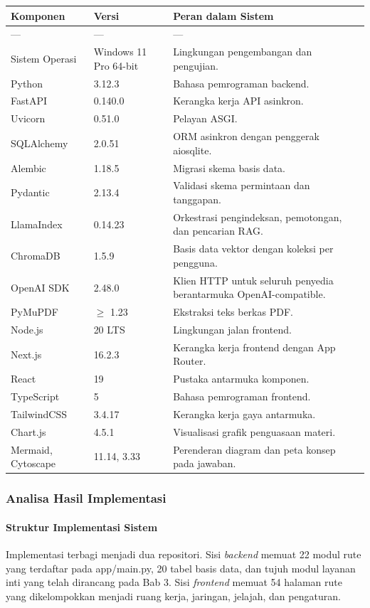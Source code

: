 \documentclass[12pt,a4paper]{article}
\begin{document}
\begin{table}[h]
\centering
\begin{tabular}{lll}
\toprule
Komponen & Versi & Peran dalam Sistem \\
\midrule
--- & --- & --- \\
Sistem Operasi & Windows 11 Pro 64-bit & Lingkungan pengembangan dan pengujian. \\
Python & 3.12.3 & Bahasa pemrograman backend. \\
FastAPI & 0.140.0 & Kerangka kerja API asinkron. \\
Uvicorn & 0.51.0 & Pelayan ASGI. \\
SQLAlchemy & 2.0.51 & ORM asinkron dengan penggerak aiosqlite. \\
Alembic & 1.18.5 & Migrasi skema basis data. \\
Pydantic & 2.13.4 & Validasi skema permintaan dan tanggapan. \\
LlamaIndex & 0.14.23 & Orkestrasi pengindeksan, pemotongan, dan pencarian RAG. \\
ChromaDB & 1.5.9 & Basis data vektor dengan koleksi per pengguna. \\
OpenAI SDK & 2.48.0 & Klien HTTP untuk seluruh penyedia berantarmuka OpenAI-compatible. \\
PyMuPDF & $\ge$ 1.23 & Ekstraksi teks berkas PDF. \\
Node.js & 20 LTS & Lingkungan jalan frontend. \\
Next.js & 16.2.3 & Kerangka kerja frontend dengan App Router. \\
React & 19 & Pustaka antarmuka komponen. \\
TypeScript & 5 & Bahasa pemrograman frontend. \\
TailwindCSS & 3.4.17 & Kerangka kerja gaya antarmuka. \\
Chart.js & 4.5.1 & Visualisasi grafik penguasaan materi. \\
Mermaid, Cytoscape & 11.14, 3.33 & Perenderan diagram dan peta konsep pada jawaban. \\
\bottomrule
\end{tabular}
\end{table}
\subsubsection*{Analisa Hasil Implementasi}
\paragraph*{Struktur Implementasi Sistem}
Implementasi terbagi menjadi dua repositori. Sisi \textit{backend} memuat 22 modul rute yang terdaftar pada app/main.py, 20 tabel basis data, dan tujuh modul layanan inti yang telah dirancang pada Bab 3. Sisi \textit{frontend} memuat 54 halaman rute yang dikelompokkan menjadi ruang kerja, jaringan, jelajah, dan pengaturan.
\end{document}
